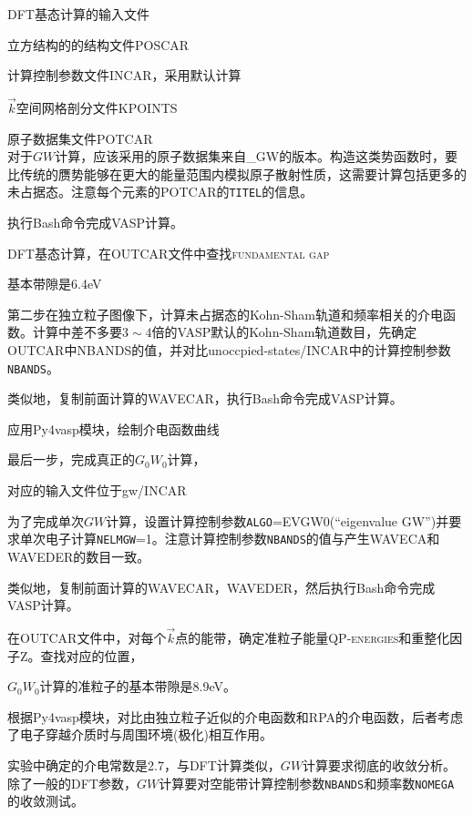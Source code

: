 \textrm{DFT}基态计算的输入文件

立方结构的的结构文件\textrm{POSCAR}

计算控制参数文件\textrm{INCAR}，采用默认计算

$\vec k$空间网格剖分文件\textrm{KPOINTS}

原子数据集文件\textrm{POTCAR}\\
对于$GW$计算，应该采用的原子数据集来自\textrm{\_GW}的版本。构造这类势函数时，要比传统的赝势能够在更大的能量范围内模拟原子散射性质，这需要计算包括更多的未占据态。注意每个元素的\textrm{POTCAR}的\texttt{TITEL}的信息。

执行\textrm{Bash}命令完成\textrm{VASP}计算。

\textrm{DFT}基态计算，在\textrm{OUTCAR}文件中查找\textsc{fundamental gap}

基本带隙是\textrm{6.4eV}

第二步在独立粒子图像下，计算未占据态的\textrm{Kohn-Sham}轨道和频率相关的介电函数。计算中差不多要$3\sim4$倍的\textrm{VASP}默认的\textrm{Kohn-Sham}轨道数目，先确定\textrm{OUTCAR}中\textrm{NBANDS}的值，并对比\textrm{unoccpied-states/INCAR}中的计算控制参数\texttt{NBANDS}。

类似地，复制前面计算的\textrm{WAVECAR}，执行\textrm{Bash}命令完成\textrm{VASP}计算。

应用\textrm{Py4vasp}模块，绘制介电函数曲线


最后一步，完成真正的$G_0W_0$计算，

对应的输入文件位于\textrm{gw/INCAR}

为了完成单次$GW$计算，设置计算控制参数\texttt{ALGO}=\textrm{EVGW0(``eigenvalue GW'')}并要求单次电子计算\texttt{NELMGW}=1。注意计算控制参数\texttt{NBANDS}的值与产生\textrm{WAVECA}和\textrm{WAVEDER}的数目一致。

类似地，复制前面计算的\textrm{WAVECAR}，\textrm{WAVEDER}，然后执行\textrm{Bash}命令完成\textrm{VASP}计算。

在\textrm{OUTCAR}文件中，对每个$\vec k$点的能带，确定准粒子能量\textsc{QP-energies}和重整化因子\textsc{Z}。查找对应的位置，

$G_0W_0$计算的准粒子的基本带隙是\textrm{8.9eV}。

根据\textrm{Py4vasp}模块，对比由独立粒子近似的介电函数和\textrm{RPA}的介电函数，后者考虑了电子穿越介质时与周围环境(极化)相互作用。

实验中确定的介电常数是2.7，与\textrm{DFT}计算类似，$GW$计算要求彻底的收敛分析。除了一般的\textrm{DFT}参数，$GW$计算要对空能带计算控制参数\texttt{NBANDS}和频率数\texttt{NOMEGA}的收敛测试。%

